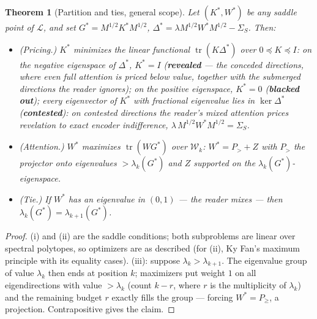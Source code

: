 \documentclass[11pt]{article}
\newtheorem{theorem}{Theorem}
\theoremstyle{definition}
\newcommand{\tr}{\operatorname{tr}}
\begin{document}
\begin{theorem}[Partition and ties, general scope]
\label{thm:partition}
Let $(K^\ast,W^\ast)$ be any saddle point of $\mathcal L$, and set
$G^\ast = M^{1/2}K^\ast M^{1/2}$,
$\Delta^\ast = \lambda M^{1/2}W^\ast M^{1/2} - \Sigma_S$. Then:
\begin{itemize}
\item[(i)] \emph{(Pricing.)} $K^\ast$ minimizes the \emph{linear}
functional $\tr(K\Delta^\ast)$ over $0\preceq K\preceq I$: on the
negative eigenspace of $\Delta^\ast$, $K^\ast = I$ (\textbf{revealed}
--- the conceded directions, where even full attention is priced
below value, together with the submerged directions the reader
ignores); on the positive eigenspace, $K^\ast = 0$
(\textbf{blacked out}); every eigenvector of $K^\ast$ with
fractional eigenvalue lies in $\ker\Delta^\ast$
(\textbf{contested}): on contested directions the reader's mixed
attention prices revelation to exact encoder indifference,
$\lambda\, M^{1/2}W^\ast M^{1/2} = \Sigma_S$.
\item[(ii)] \emph{(Attention.)} $W^\ast$ maximizes $\tr(WG^\ast)$
over $\mathcal W_k$: $W^\ast = P_{>} + Z$ with $P_{>}$ the projector
onto eigenvalues $>\lambda_k(G^\ast)$ and $Z$ supported on the
$\lambda_k(G^\ast)$-eigenspace.
\item[(iii)] \emph{(Tie.)} If $W^\ast$ has an eigenvalue in $(0,1)$
--- the reader mixes --- then
$\lambda_k(G^\ast) = \lambda_{k+1}(G^\ast)$.
\end{itemize}
\end{theorem}

\begin{proof}
(i) and (ii) are the saddle conditions; both subproblems are linear
over spectral polytopes, so optimizers are as described (for (ii),
Ky Fan's maximum principle with its equality cases). (iii): suppose
$\lambda_k > \lambda_{k+1}$. The eigenvalue group of value
$\lambda_k$ then ends at position $k$; maximizers put weight $1$ on
all eigendirections with value $>\lambda_k$ (count $k-r$, where $r$
is the multiplicity of $\lambda_k$) and the remaining budget $r$
exactly fills the group --- forcing $W^\ast = P_{\ge}$, a
projection. Contrapositive gives the claim.
\end{proof}
\end{document}
